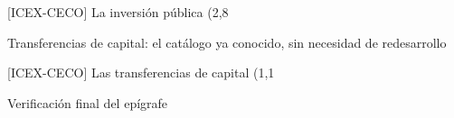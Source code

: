 \documentclass[10pt,a4paper]{article}
\begin{document}
[ICEX-CECO] La inversión pública (2,8%

Transferencias de capital: el catálogo ya conocido, sin necesidad de redesarrollo

[ICEX-CECO] Las transferencias de capital (1,1%

Verificación final del epígrafe
\end{document}
